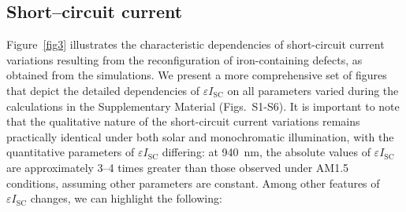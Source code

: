 \documentclass[a4paper,fleqn]{cas-sc}
\begin{document}
\subsection{Short--circuit current}

Figure~\ref{fig3} illustrates the characteristic dependencies of short-circuit current variations resulting
from the reconfiguration of iron-containing defects, as obtained from the simulations.
We present a more comprehensive set of figures that depict the detailed dependencies of $\varepsilon I_\mathrm{SC}$ on
all parameters varied during the calculations in the Supplementary Material (Figs.~S1-S6).
It is important to note that the qualitative nature of the short-circuit current variations remains practically identical
under both solar and monochromatic illumination, with the quantitative parameters of $\varepsilon I_\mathrm{SC}$ differing:
at 940~nm, the absolute values of $\varepsilon I_\mathrm{SC}$ are approximately 3--4 times greater than those observed under AM1.5 conditions,
assuming other parameters are constant.
Among other features of $\varepsilon I_\mathrm{SC}$ changes, we can highlight the following:
\end{document}
